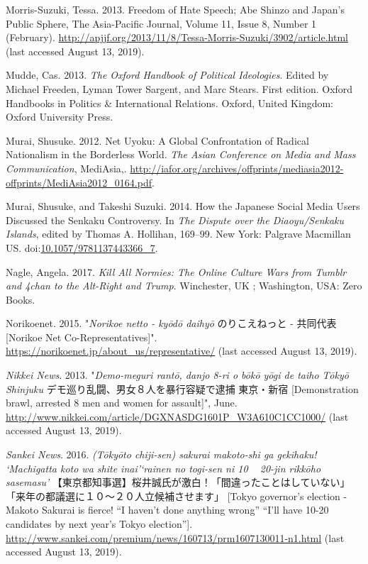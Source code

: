 \documentclass[10pt,british,A4paper,twoside]{memoir}
\begin{document}
\hypertarget{ref-morris-suzuki_freedom_2013}{}
Morris-Suzuki, Tessa. 2013. Freedom of Hate Speech; Abe Shinzo and
Japan's Public Sphere, The Asia-Pacific Journal, Volume 11, Issue 8,
Number 1 (February).
\url{http://apjjf.org/2013/11/8/Tessa-Morris-Suzuki/3902/article.html} (last accessed August 13, 2019).

\hypertarget{ref-mudde_oxford_2013}{}
Mudde, Cas. 2013. \emph{The Oxford Handbook of Political Ideologies}.
Edited by Michael Freeden, Lyman Tower Sargent, and Marc Stears. First
edition. Oxford Handbooks in Politics \& International Relations.
Oxford, United Kingdom: Oxford University Press.

\hypertarget{ref-murai_net_2012}{}
Murai, Shusuke. 2012. Net Uyoku: A Global Confrontation of Radical
Nationalism in the Borderless World. \emph{The Asian Conference on Media
and Mass Communication}, MediAsia,.
\url{http://iafor.org/archives/offprints/mediasia2012-offprints/MediAsia2012_0164.pdf}.

\hypertarget{ref-hollihan_how_2014}{}
Murai, Shusuke, and Takeshi Suzuki. 2014. How the Japanese Social Media
Users Discussed the Senkaku Controversy. In \emph{The Dispute over the
Diaoyu/Senkaku Islands}, edited by Thomas A. Hollihan, 169--99. New
York: Palgrave Macmillan US.
doi:\href{https://doi.org/10.1057/9781137443366_7}{10.1057/9781137443366\_7}.

\hypertarget{ref-nagle_kill_2017}{}
Nagle, Angela. 2017. \emph{Kill All Normies: The Online Culture Wars
from Tumblr and 4chan to the Alt-Right and Trump}. Winchester, UK ;
Washington, USA: Zero Books.

\hypertarget{ref-net_norikoe_2015}{}
Norikoenet. 2015. "\emph{Norikoe netto - kyōdō daihyō} のりこえねっと - 共同代表 [Norikoe Net Co-Representatives]".
\url{https://norikoenet.jp/about_us/representative/} (last accessed August 13, 2019).

\hypertarget{ref-nikkei_news__2013}{}
\emph{Nikkei News}. 2013. "\emph{Demo-meguri rantō, danjo 8-ri o bōkō yōgi de taiho Tōkyō Shinjuku} デモ巡り乱闘、男女８人を暴行容疑で逮捕 東京・新宿 [Demonstration brawl, arrested 8 men and women for assault]",
June. \url{http://www.nikkei.com/article/DGXNASDG1601P_W3A610C1CC1000/} (last accessed August 13, 2019).

\hypertarget{ref-sankei_news__2016}{}
\emph{Sankei News}. 2016.
\emph{(Tōkyōto chiji-sen) sakurai makoto-shi ga gekihaku! `Machigatta koto wa shite inai'`rainen no togi-sen ni 10 ~ 20-jin rikkōho sasemasu'} 【東京都知事選】桜井誠氏が激白！「間違ったことはしていない」「来年の都議選に１０～２０人立候補させます」 [Tokyo governor's election - Makoto Sakurai is fierce! “I haven’t done anything wrong” “I’ll have 10-20 candidates by next year’s Tokyo election”].
\url{http://www.sankei.com/premium/news/160713/prm1607130011-n1.html} (last accessed August 13, 2019).
\end{document}
